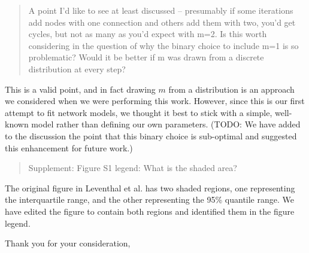 \documentclass[12pt]{letter}
\begin{document}
\begin{letter}{ }
\begin{quote}
  A point I’d like to see at least discussed – presumably if some iterations
  add nodes with one connection and others add them with two, you’d get cycles,
  but not as many as you’d expect with m=2. Is this worth considering in the
  question of why the binary choice to include m=1 is so problematic? Would it
  be better if m was drawn from a discrete distribution at every step?
\end{quote}

This is a valid point, and in fact drawing $m$ from a distribution is an
approach we considered when we were performing this work. However, since this
is our first attempt to fit network models, we thought it best to stick with
a simple, well-known model rather than defining our own parameters. (TODO: We
have added to the discussion the point that this binary choice is sub-optimal
and suggested this enhancement for future work.)

\begin{quote}
  Supplement:
  Figure S1 legend: What is the shaded area?
\end{quote}

The original figure in Leventhal et al. has two shaded regions, one
representing the interquartile range, and the other representing the 95\%
quantile range. We have edited the figure to contain both regions and
identified them in the figure legend.

\closing{Thank you for your consideration,}
\end{letter}
\end{document}
